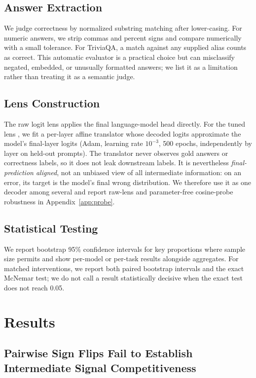 \documentclass{article} %
\begin{document}
\subsection{Answer Extraction}
We judge correctness by normalized substring matching after lower-casing. For numeric answers, we strip commas and percent signs and compare numerically with a small tolerance. For TriviaQA, a match against any supplied alias counts as correct. This automatic evaluator is a practical choice but can misclassify negated, embedded, or unusually formatted answers; we list it as a limitation rather than treating it as a semantic judge.

\subsection{Lens Construction}
The raw logit lens applies the final language-model head directly. For the tuned lens \citep{belrose2023tunedlens}, we fit a per-layer affine translator whose decoded logits approximate the model's final-layer logits (Adam, learning rate $10^{-3}$, 500 epochs, independently by layer on held-out prompts). The translator never observes gold answers or correctness labels, so it does not leak downstream labels. It is nevertheless \emph{final-prediction aligned}, not an unbiased view of all intermediate information: on an error, its target is the model's final wrong distribution. We therefore use it as one decoder among several and report raw-lens and parameter-free cosine-probe robustness in Appendix~\ref{app:probe}.

\subsection{Statistical Testing}
We report bootstrap 95\% confidence intervals for key proportions where sample size permits and show per-model or per-task results alongside aggregates. For matched interventions, we report both paired bootstrap intervals and the exact McNemar test; we do not call a result statistically decisive when the exact test does not reach 0.05.

\section{Results}

\subsection{Pairwise Sign Flips Fail to Establish Intermediate Signal Competitiveness}
\end{document}
